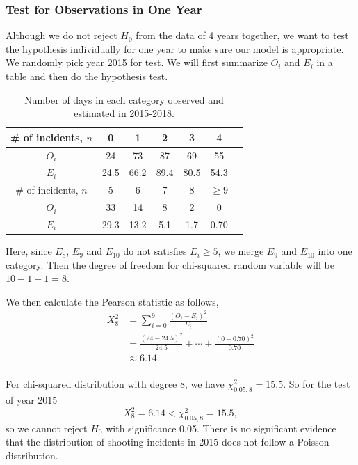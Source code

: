 \documentclass[11pt,a4paper,english]{article}
\begin{document}
\subsubsection{Test for Observations in One Year}
Although we do not reject $H_{0}$ from the data of 4 years together, we want to test the hypothesis individually for one year to make sure our model is appropriate. We randomly pick year 2015 for test. We will first summarize $O_{i}$ and $E_{i}$ in a table and then do the hypothesis test.

\begin{table}[htbp]
    \centering
	\begin{tabular}{c|cccccc}
		\hline
        \# of incidents, $n$ & 0 & 1 & 2 & 3 & 4  \\
		\hline
		$O_{i}$ & 24 & 73 & 87 & 69 & 55 \\
		\hline
		$E_{i}$ & 24.5 & 66.2 & 89.4 & 80.5 & 54.3 \\ 
		\hline
		\hline
		\# of incidents, $n$ & 5 & 6 & 7 & 8 & $\geq 9$  \\
		\hline
		$O_{i}$ & 33 & 14 & 8 & 2 & 0\\
		\hline
		$E_{i}$ & 29.3 & 13.2 & 5.1 & 1.7 & 0.70\\ 
		\hline 
    \end{tabular}
	\caption{Number of days in each category observed and estimated in 2015-2018.}
\end{table}

Here, since $E_{8}$, $E_{9}$ and $E_{10}$ do not satisfies $E_{i} \geq 5$, we merge $E_{9}$ and $E_{10}$ into one category. Then the degree of freedom for chi-squared random variable will be $10-1-1 = 8$.

We then calculate the Pearson statistic as follows,
\begin{align*}
	X_{8}^{2} &= \sum_{i = 0}^{9}\frac{(O_{i}-E_{i})^{2}}{E_{i}}\\
	&= \frac{(24-24.5)^{2}}{24.5}+\cdots+\frac{(0-0.70)^{2}}{0.70}\\
	&\approx 6.14.\\
\end{align*}

For chi-squared distribution with degree 8, we have $\chi_{0.05,8}^{2} = 15.5$. So for the test of year 2015
\begin{equation*}
	X_{8}^{2} = 6.14 < \chi_{0.05,8}^{2} = 15.5,
\end{equation*}
so we cannot reject $H_{0}$ with significance 0.05.
There is no significant evidence that the distribution of shooting incidents in 2015 does not follow a Poisson distribution.
\end{document}
